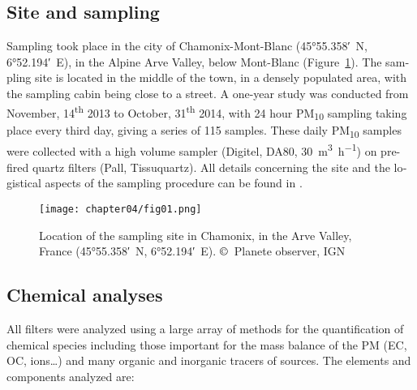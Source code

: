 \begin{otherlanguage}{english}
\subsection{Site and sampling}\label{site-and-sampling}

Sampling took place in the city of Chamonix-Mont-Blanc
(\ang{45;55.358;}~N, \ang{6;52.194;}~E),
in the Alpine Arve Valley, below Mont-Blanc (Figure~\ref{fig:cham}). The
sampling site is located in the middle of the town, in a densely populated area,
with the sampling cabin being close to a street. A one-year study was conducted
from November, 14\textsuperscript{th} 2013 to October, 31\textsuperscript{th}
2014, with 24 hour PM\textsubscript{10} sampling taking place every third day,
giving a series of 115 samples. These daily PM\textsubscript{10} samples were
collected with a high volume sampler (Digitel, DA80, \SI{30}{\cubic\meter\per\hour}) on
pre-fired quartz filters (Pall, Tissuquartz). All details concerning the site
and the logistical aspects of the sampling procedure can be found in
\textcite{chevrierChauffage2016}.

\begin{figure}[ht]
    \centering
    \texttt{[image: chapter04/fig01.png]}
    \caption{Location of the sampling site in Chamonix, in the Arve Valley,
    France (\ang{45;55.358;}~N, \ang{6;52.194;}~E).  $\copyright$~Planete observer, IGN}
    \label{fig:cham}
\end{figure}

\subsection{Chemical analyses }\label{chemical-analyses}

All filters were analyzed using a large array of methods for the quantification
of chemical species including those important for the mass balance of the PM
(EC, OC, ions\ldots{}) and many organic and inorganic tracers of
sources. The elements and components analyzed are:


\end{otherlanguage}
